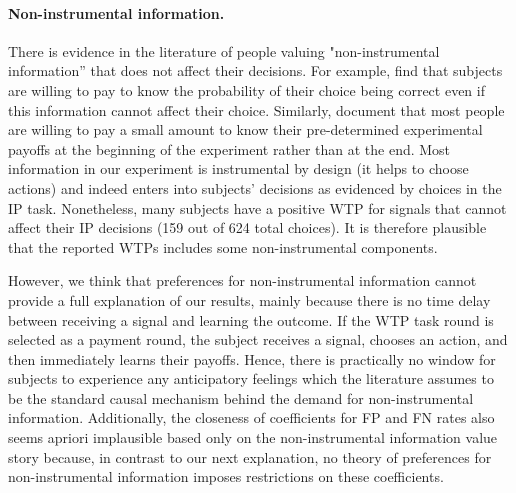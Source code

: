 \documentclass[12pt,a4paper]{article}
\begin{document}
\paragraph{Non-instrumental information.} There is evidence in the literature of people valuing "non-instrumental information'' that does not affect their decisions. For example, \citet{eliaz_paying_2010} find that subjects are willing to pay to know the probability of their choice being correct even if this information cannot affect their choice. Similarly, \citet{ganguly_fantasy_2017} document that most people are willing to pay a small amount to know their pre-determined experimental payoffs at the beginning of the experiment rather than at the end. 
Most information in our experiment is instrumental by design (it helps to choose actions) and indeed enters into subjects' decisions as evidenced by choices in the IP task. Nonetheless, many subjects have a positive WTP for signals that cannot affect their IP decisions (159 out of 624 total choices). It is therefore plausible that the reported WTPs includes some non-instrumental components. 

However, we think that preferences for non-instrumental information cannot provide a full explanation of our results, mainly because there is no time delay between receiving a signal and learning the outcome. If the WTP task round is selected as a payment round, the subject receives a signal, chooses an action, and then immediately learns their payoffs. Hence, there is practically no window for subjects to experience any anticipatory feelings which the literature assumes to be the standard causal mechanism behind the demand for non-instrumental information. Additionally, the closeness of coefficients for FP and FN rates also seems apriori implausible based only on the non-instrumental information value story because, in contrast to our next explanation, no theory of preferences for non-instrumental information imposes restrictions on these coefficients.
\end{document}
